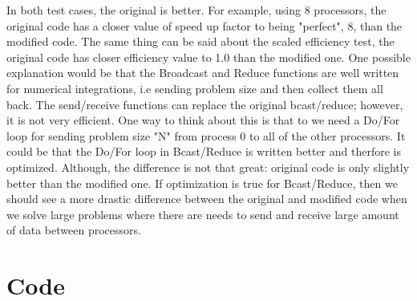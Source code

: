 \documentclass[12pt]{article}
\begin{document}
	In both test cases, the original is better.  For example, using 8 processors, the original code has a closer value of speed up factor to being "perfect", 8, than the modified code.  The same thing can be said about the scaled efficiency test, the original code has closer efficiency value to 1.0 than the modified one. One possible explanation would be that the Broadcast and Reduce functions are well written for numerical integrations, i.e sending problem size and then collect them all back.  The send/receive functions can replace the original bcast/reduce; however, it is not very efficient.  One way to think about this is that to we need a Do/For loop for sending problem size "N" from process 0 to all of the other processors. It could be that the Do/For loop in Bcast/Reduce is written better and therfore is optimized. Although, the difference is not that great: original code is only slightly better than the modified one. If optimization is true for Bcast/Reduce, then we should see a more drastic difference between the original and modified code when we solve large problems where there are needs to send and receive large amount of data between processors. 

	\section{Code}
\end{document}
